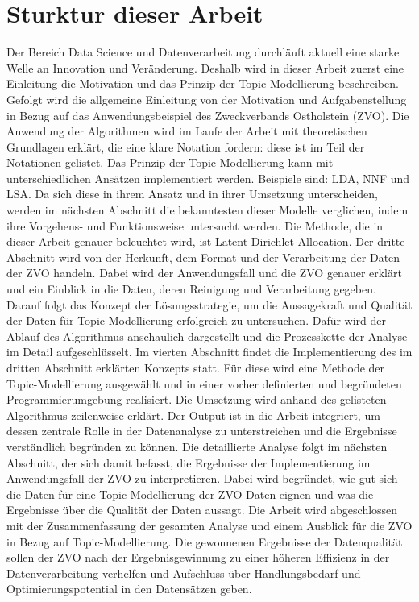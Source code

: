 \documentclass[german,version-2020-11]{uzl-thesis}
\begin{document}
\section{Sturktur dieser Arbeit}
Der Bereich Data Science und Datenverarbeitung durchläuft aktuell eine starke Welle an Innovation und Veränderung. Deshalb wird in dieser Arbeit zuerst eine Einleitung die Motivation und das Prinzip der Topic-Modellierung beschreiben. Gefolgt wird die allgemeine Einleitung von der Motivation und Aufgabenstellung in Bezug auf das Anwendungsbeispiel des Zweckverbands Ostholstein (ZVO). Die Anwendung der Algorithmen wird im Laufe der Arbeit mit theoretischen Grundlagen erklärt, die eine klare Notation fordern: diese ist im Teil der Notationen gelistet. Das Prinzip der Topic-Modellierung kann mit unterschiedlichen Ansätzen implementiert werden. Beispiele sind: LDA, NNF und LSA. Da sich diese in ihrem Ansatz und in ihrer Umsetzung unterscheiden, werden im nächsten Abschnitt die bekanntesten dieser Modelle verglichen, indem ihre Vorgehens- und Funktionsweise untersucht werden. Die Methode, die in dieser Arbeit genauer beleuchtet wird, ist Latent Dirichlet Allocation. Der dritte Abschnitt wird von der Herkunft, dem Format und der Verarbeitung der Daten der ZVO handeln. Dabei wird der Anwendungsfall und die ZVO genauer erklärt und ein Einblick in die Daten, deren Reinigung und Verarbeitung gegeben. Darauf folgt das Konzept der Lösungsstrategie, um die Aussagekraft und Qualität der Daten für Topic-Modellierung erfolgreich zu untersuchen. Dafür wird der Ablauf des Algorithmus anschaulich dargestellt und die Prozesskette der Analyse im Detail aufgeschlüsselt. Im vierten Abschnitt findet die Implementierung des im dritten Abschnitt erklärten Konzepts statt. Für diese wird eine Methode der Topic-Modellierung ausgewählt und in einer vorher definierten und begründeten Programmierumgebung realisiert. Die Umsetzung wird anhand des gelisteten Algorithmus zeilenweise erklärt. Der Output ist in die Arbeit integriert, um dessen zentrale Rolle in der Datenanalyse zu unterstreichen und die Ergebnisse verständlich begründen zu können. Die detaillierte Analyse folgt im nächsten Abschnitt, der sich damit befasst, die Ergebnisse der Implementierung im Anwendungsfall der ZVO zu interpretieren. Dabei wird begründet, wie gut sich die Daten für eine Topic-Modellierung der ZVO Daten eignen und was die Ergebnisse über die Qualität der Daten aussagt. Die Arbeit wird abgeschlossen mit der Zusammenfassung der gesamten Analyse und einem Ausblick für die ZVO in Bezug auf Topic-Modellierung. Die gewonnenen Ergebnisse der Datenqualität sollen der ZVO nach der Ergebnisgewinnung zu einer höheren Effizienz in der Datenverarbeitung verhelfen und Aufschluss über Handlungsbedarf und Optimierungspotential in den Datensätzen geben.
\end{document}
